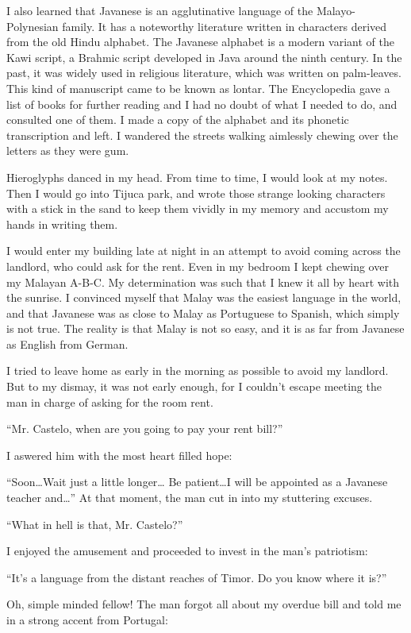 \documentclass[a4paper,12pt]{book}
\begin{document}
I also learned that Javanese is an agglutinative
language of the Malayo-Polynesian family.
It has a noteworthy literature written in
characters derived from the old Hindu alphabet.
The Javanese alphabet is a modern variant
of the Kawi script, a Brahmic script developed
in Java around the ninth century.
In the past, it was widely used in religious literature,
which was written on palm-leaves.
This kind of manuscript came to be known
as  lontar.
The Encyclopedia gave a list of books for further
reading and I had no doubt of what I needed
to do, and consulted one of them.
I made a copy of the alphabet and its phonetic
transcription and left. I wandered the streets
walking aimlessly chewing over the letters as
they were gum.

Hieroglyphs danced in my head. From time to time,
I would look at my notes. Then I would
go into Tijuca park, and wrote
those strange looking characters
with a stick in the sand to keep
them vividly in my memory
and accustom my hands in writing them.

I would enter my building late at night in
an attempt to avoid coming across the
landlord, who could ask for the rent.
Even in my bedroom I kept chewing over
my Malayan A-B-C. My determination was such
that I knew it all by heart with the sunrise.
I convinced myself that Malay was the
easiest language in the world, and that Javanese
was as close to Malay as Portuguese to
Spanish, which simply is not true.
The reality is that Malay is not so
easy, and it is  as
far from Javanese as English from German.

I tried to leave home as early in the morning
as possible to avoid my landlord.
But to my dismay, it was not early enough,
for I couldn't escape meeting the man
in charge of asking for the room rent.

``Mr. Castelo, when are you going to
pay your rent bill?''

I aswered him with the most heart filled hope:

``Soon\ldots Wait just a little longer\ldots
Be patient\ldots I will be appointed as a
Javanese teacher and\ldots''
At that moment, the man cut in into my stuttering
excuses.

``What in hell is that, Mr. Castelo?''

I enjoyed the amusement
and proceeded to invest
in the man's patriotism:

``It's a language from the distant reaches of Timor.
Do you know where it is?''

Oh, simple minded fellow! The man forgot all about
my overdue bill and told me in a strong accent
from Portugal:
\end{document}
